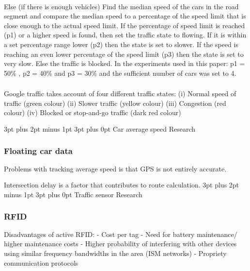 \documentclass[12pt,a4paper]{article}
\makeatletter
\renewcommand\subsection{\@startsection {subsection}{1}{2mm} %
                               {3pt plus 2pt minus 1pt} %
                               {3pt plus 0pt} %
                               {\normalfont\bfseries}}
\makeatother
\begin{document}
\paragraph{}
Else (if there is enough vehicles)
  Find the median speed of the cars in the road segment and compare the median speed to a percentage of the speed limit that is close enough to the actual speed limit.
  If the percentage of speed limit is reached (p1) or a higher speed is found, then set the traffic state to flowing.
  If it is within a set percentage range lower (p2) then the state is set to slower.
  If the speed is reaching an even lower percentage of the speed limit (p3) then the state is set to very slow.
  Else the traffic is blocked.
  In the experiments used in this paper: p1 = 50\% , p2 = 40\% and p3 = 30\% and the sufficient number of cars was set to 4.
  
  \subsubsection{}
  Google traffic takes account of four different traffic states: 
  (i) Normal speed of traffic (green colour)
  (ii) Slower traffic (yellow colour)
  (iii) Congestion (red colour)
  (iv) Blocked or stop-and-go traffic (dark red colour)

\subsection{Car average speed Research}

\subsubsection{Floating car data}
Problems with tracking average speed is that GPS is not entirely accurate. \cite{Jia}

Intersection delay is a factor that contributes to route calculation. \cite{Liu}
\subsection{Traffic sensor Research}
\subsubsection{RFID}
Disadvantages of active RFID: 
- Cost per tag
- Need for battery maintenance/ higher maintenance costs
- Higher probability of interfering with other devices using similar frequency bandwidths in the area (ISM networks)
- Propriety communication protocols
\end{document}
